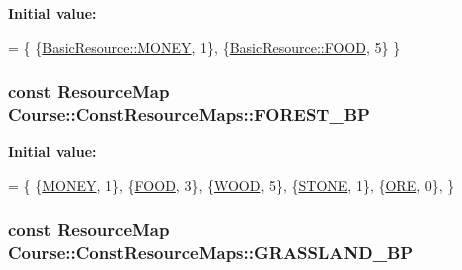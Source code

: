 {\bfseries Initial value\-:}
\begin{DoxyCode}
= \{
    \{\hyperlink{namespaceCourse_a02d49c04029594d4adba79b84bb85f65aff016add6bbbdbb44abf1d2d7f215ec0}{BasicResource::MONEY}, 1\},
    \{\hyperlink{namespaceCourse_a02d49c04029594d4adba79b84bb85f65a7018c47af38bfc1390a89e70b4cf4760}{BasicResource::FOOD}, 5\}
\}
\end{DoxyCode}
\hypertarget{namespaceCourse_1_1ConstResourceMaps_a7dcae89456b97bd487124b43c1b63a1c}{
\subsubsection[{F\-O\-R\-E\-S\-T\-\_\-\-B\-P}]{\setlength{\rightskip}{0pt plus 5cm}const {\bf Resource\-Map} Course\-::\-Const\-Resource\-Maps\-::\-F\-O\-R\-E\-S\-T\-\_\-\-B\-P}}\label{namespaceCourse_1_1ConstResourceMaps_a7dcae89456b97bd487124b43c1b63a1c}
{\bfseries Initial value\-:}
\begin{DoxyCode}
= \{
    \{\hyperlink{namespaceCourse_a02d49c04029594d4adba79b84bb85f65aff016add6bbbdbb44abf1d2d7f215ec0}{MONEY}, 1\},
    \{\hyperlink{namespaceCourse_a02d49c04029594d4adba79b84bb85f65a7018c47af38bfc1390a89e70b4cf4760}{FOOD}, 3\},
    \{\hyperlink{namespaceCourse_a02d49c04029594d4adba79b84bb85f65a87287be3009253b983ffb2e9f91eef22}{WOOD}, 5\},
    \{\hyperlink{namespaceCourse_a02d49c04029594d4adba79b84bb85f65a8598c3079c2be7785410e724cc190229}{STONE}, 1\},
    \{\hyperlink{namespaceCourse_a02d49c04029594d4adba79b84bb85f65af416a215c7dad21349df38d35be0a1e1}{ORE}, 0\},
\}
\end{DoxyCode}
\hypertarget{namespaceCourse_1_1ConstResourceMaps_aae4ef780a53ec4726ff947ecae010082}{
\subsubsection[{G\-R\-A\-S\-S\-L\-A\-N\-D\-\_\-\-B\-P}]{\setlength{\rightskip}{0pt plus 5cm}const {\bf Resource\-Map} Course\-::\-Const\-Resource\-Maps\-::\-G\-R\-A\-S\-S\-L\-A\-N\-D\-\_\-\-B\-P}}\label{namespaceCourse_1_1ConstResourceMaps_aae4ef780a53ec4726ff947ecae010082}
